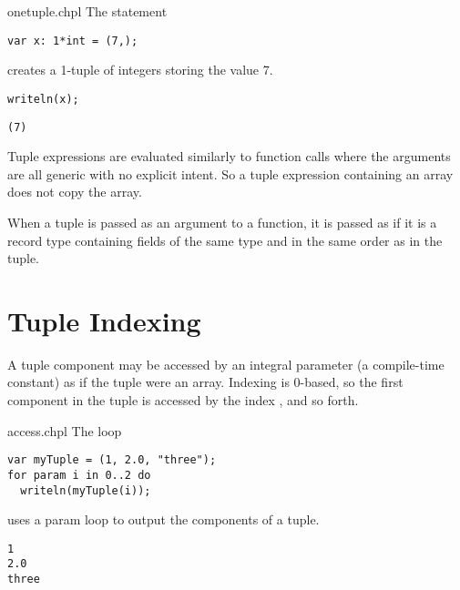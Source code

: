 \begin{chapelexample}{onetuple.chpl}
The statement
\begin{chapel}
\begin{verbatim}
var x: 1*int = (7,);
\end{verbatim}
\end{chapel}
creates a 1-tuple of integers storing the value 7.
\begin{chapelpost}
\begin{verbatim}
writeln(x); 
\end{verbatim}
\end{chapelpost}
\begin{chapeloutput}
\begin{verbatim}
(7)
\end{verbatim}
\end{chapeloutput}
\end{chapelexample}

Tuple expressions are evaluated similarly to function calls where the
arguments are all generic with no explicit intent.  So a tuple
expression containing an array does not copy the array.  

When a tuple is passed as an argument to a function, it is passed as
if it is a record type containing fields of the same type and in
the same order as in the tuple.

\section{Tuple Indexing}
\label{Tuple_Indexing}

A tuple component may be accessed by an integral parameter (a compile-time
constant) as if the tuple were an array.  Indexing is 0-based, so the
first component in the tuple is accessed by the index , and so
forth.

\begin{chapelexample}{access.chpl}
The loop
\begin{chapel}
\begin{verbatim}
var myTuple = (1, 2.0, "three");
for param i in 0..2 do
  writeln(myTuple(i));
\end{verbatim}
\end{chapel}
uses a param loop to output the components of a tuple.
\begin{chapeloutput}
\begin{verbatim}
1
2.0
three
\end{verbatim}
\end{chapeloutput}
\end{chapelexample}

